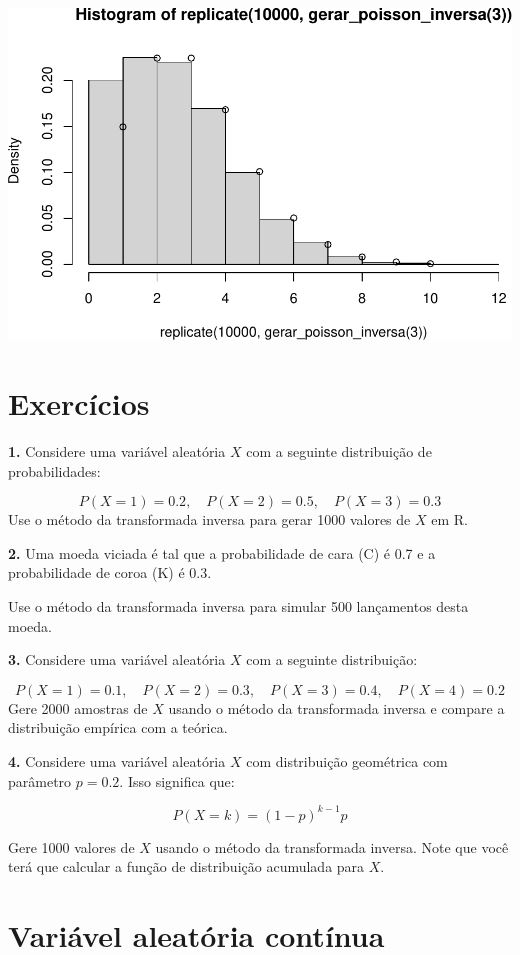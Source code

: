 \documentclass[
]{book}
\begin{document}
\includegraphics{introR_files/figure-latex/unnamed-chunk-237-1.pdf}

\section{Exercícios}\label{exercuxedcios-21}

\textbf{1.} Considere uma variável aleatória \(X\) com a seguinte distribuição
de probabilidades:

\[P(X = 1) = 0.2, \quad P(X = 2) = 0.5, \quad P(X = 3) = 0.3\] Use o
método da transformada inversa para gerar 1000 valores de \(X\) em R.

\textbf{2.} Uma moeda viciada é tal que a probabilidade de cara (C) é 0.7 e a
probabilidade de coroa (K) é 0.3.

Use o método da transformada inversa para simular 500 lançamentos desta
moeda.

\textbf{3.} Considere uma variável aleatória \(X\) com a seguinte distribuição:

\[P(X = 1) = 0.1, \quad P(X = 2) = 0.3, \quad P(X = 3) = 0.4, \quad P(X = 4) = 0.2\]
Gere 2000 amostras de \(X\) usando o método da transformada inversa e
compare a distribuição empírica com a teórica.

\textbf{4.} Considere uma variável aleatória \(X\) com distribuição geométrica
com parâmetro \(p = 0.2\). Isso significa que:

\[P(X = k) = (1 - p)^{k-1}p\]

Gere 1000 valores de \(X\) usando o método da transformada inversa. Note
que você terá que calcular a função de distribuição acumulada para \(X\).

\section{Variável aleatória contínua}\label{variuxe1vel-aleatuxf3ria-contuxednua}
\end{document}
